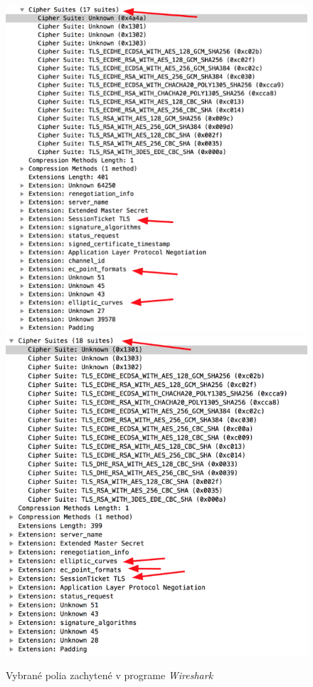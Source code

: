 \begin{figure}[!ht]
 \includegraphics[width=\linewidth]{obrazky-figures/ja3_first.png}
 \endminipage
 \includegraphics[width=\linewidth]{obrazky-figures/ja3_2nd.png}
 \endminipage
\caption{Vybrané polia zachytené v programe \emph{Wireshark}\cite{althouse}}
\centering
\label{ja3wireshark}
\end{figure}
